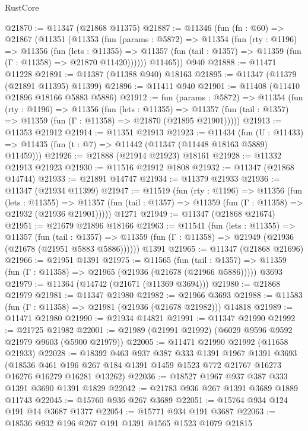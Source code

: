 \begin{lexlean}{RustCore}
\begin{coremodule}
@21870 := @11347 (@21868 @11375)
@21887 := @11346
    (fun (fn : @60) =>
    @21867
      (@11351
        (@11353
          (fun (params : @5872) =>
          @11354
            (fun (rty : @1196) =>
            @11356
              (fun (lets : @11355) =>
              @11357 (fun (tail : @1357) => @11359 (fun (Γ : @11358) => @21870 @11420))))))
        @11465))
    @940
@21888 := @11471 @11228
@21891 := @11387 (@11388 @940) @18163
@21895 := @11347 (@11379 (@21891 @11395) @11399)
@21896 := @11411 @940
@21901 := @11408 (@11410 @21896 @18166 @5883 @5886)
@21912 := fun (params : @5872) =>
  @11354
    (fun (rty : @1196) =>
    @11356
      (fun (lets : @11355) =>
      @11357 (fun (tail : @1357) => @11359 (fun (Γ : @11358) => @21870 (@21895 @21901)))))
@21913 := @11353 @21912
@21914 := @11351 @21913
@21923 := @11434
    (fun (U : @11433) => @11435 (fun (t : @7) => @11442 (@11347 (@11448 @18163 @5889) @11459)))
@21926 := @21888 (@21914 @21923) @18161
@21928 := @11332 @21913 @21923
@21930 := @11516 @21912 @1808
@21932 := @11347 (@21868 @14744)
@21933 := @21891 @14747
@21934 := @11379 @21933
@21936 := @11347 (@21934 @11399)
@21947 := @11519
    (fun (rty : @1196) =>
    @11356
      (fun (lets : @11355) =>
      @11357 (fun (tail : @1357) => @11359 (fun (Γ : @11358) => @21932 (@21936 @21901)))))
    @1271
@21949 := @11347 (@21868 @21674)
@21951 := @21679 @21896 @18166
@21963 := @11541
    (fun (lets : @11355) =>
    @11357
      (fun (tail : @1357) =>
      @11359 (fun (Γ : @11358) => @21949 (@21936 (@21678 (@21951 @5883 @5886))))))
    @1391
@21965 := @11347 (@21868 @21696)
@21966 := @21951 @1391
@21975 := @11565
    (fun (tail : @1357) => @11359 (fun (Γ : @11358) => @21965 (@21936 (@21678 (@21966 @5886)))))
    @3693
@21979 := @11364 (@14742 (@21671 (@11369 @3694)))
@21980 := @21868 @21979
@21981 := @11347 @21980
@21982 := @21966 @3693
@21988 := @11583 (fun (Γ : @11358) => @21981 (@21936 (@21678 @21982))) @14818
@21989 := @11471 @21980
@21990 := @21934 @14821
@21991 := @11347 @21990
@21992 := @21725 @21982
@22001 := @21989 (@21991 @21992) (@6029 @9596 @9592 @21979 @9603 (@5900 @21979))
@22005 := @11471 @21990 @21992 (@11658 @21933)
@22028 := @18392
    @463
    @937
    @387
    @333
    @1391
    @1967
    @1391
    @3693
    (@18536 @461 @196 @267 @184 @1391 @1459 @1523 @772 @21767 @16273 @16276 @16279 @16281 @13262)
@22036 := @18527 @1967 @937 @387 @333 @1391 @3690 @1391 @1829
@22042 := @21783 @936 @267 @1391 @3689 @1889 @11743
@22045 := @15760 @936 @267 @3689
@22051 := @15764 @934 @124 @191 @14 @3687 @1377
@22054 := @15771 @934 @191 @3687
@22063 := @18536 @932 @196 @267 @191 @1391 @1565 @1523 @1079 @21815

\end{coremodule}
\end{lexlean}
